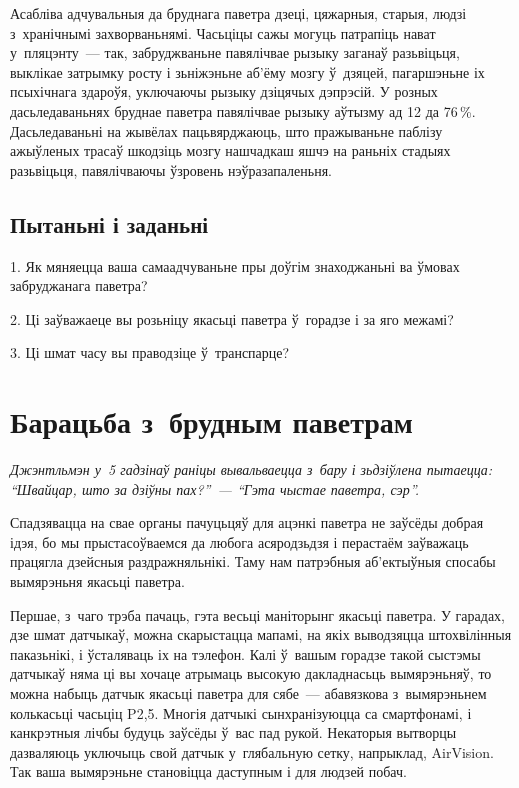 
Асабліва адчувальныя да бруднага паветра дзеці, цяжарныя, старыя, людзі з~хранічнымі захворваньнямі. Часьціцы сажы могуць патрапіць нават у~пляцэнту~--- так, забруджваньне павялічвае рызыку заганаў разьвіцьця, выклікае затрымку росту і зьніжэньне аб'ёму мозгу ў~дзяцей, пагаршэньне іх псыхічнага здароўя, уключаючы рызыку дзіцячых дэпрэсій. У розных дасьледаваньнях бруднае паветра павялічвае рызыку аўтызму ад 12 да 76\,\%. Дасьледаваньні на жывёлах пацьвярджаюць, што пражываньне паблізу ажыўленых трасаў шкодзіць мозгу нашчадкаш яшчэ на раньніх стадыях разьвіцьця, павялічваючы ўзровень нэўразапаленьня.

\subsection*{Пытаньні і заданьні}

1. Як мяняецца ваша самаадчуваньне пры доўгім знаходжаньні ва ўмовах забруджанага паветра?

2. Ці заўважаеце вы розьніцу якасьці паветра ў~горадзе і за яго межамі?

3. Ці шмат часу вы праводзіце ў~транспарце?


\section{Барацьба з~брудным паветрам}

\emph{Джэнтльмэн у~5 гадзінаў раніцы вывальваецца з~бару і зьдзіўлена пытаецца: ``Швайцар, што за дзіўны пах?''~--- ``Гэта чыстае паветра, сэр''.}

Спадзявацца на свае органы пачуцьцяў для ацэнкі паветра не заўсёды добрая ідэя, бо мы прыстасоўваемся да любога асяродзьдзя і перастаём заўважаць працягла дзейсныя раздражняльнікі. Таму нам патрэбныя аб'ектыўныя спосабы вымярэньня якасьці паветра.

Першае, з~чаго трэба пачаць, гэта весьці маніторынг якасьці паветра. У гарадах, дзе шмат датчыкаў, можна скарыстацца мапамі, на якіх выводзяцца штохвілінныя паказьнікі, і ўсталяваць іх на тэлефон. Калі ў~вашым горадзе такой сыстэмы датчыкаў няма ці вы хочаце атрымаць высокую дакладнасьць вымярэньняў, то можна набыць датчык якасьці паветра для сябе~--- абавязкова з~вымярэньнем колькасьці часьціц P2,5. Многія датчыкі сынхранізуюцца са смартфонамі, і канкрэтныя лічбы будуць заўсёды ў~вас пад рукой. Некаторыя вытворцы дазваляюць уключыць свой датчык у~глябальную сетку, напрыклад, AirVision. Так ваша вымярэньне становіцца даступным і для людзей побач.

